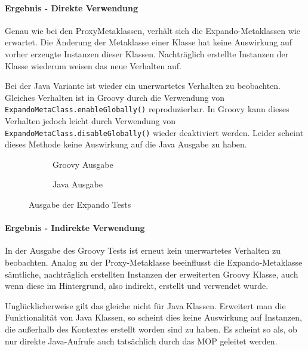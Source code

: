 \paragraph{Ergebnis - Direkte Verwendung}
Genau wie bei den ProxyMetaklassen, verhält sich die Expando-Metaklassen wie erwartet.
Die Änderung der Metaklasse einer Klasse hat keine Auswirkung auf vorher erzeugte Instanzen dieser Klassen.
Nachträglich erstellte Instanzen der Klasse wiederum weisen das neue Verhalten auf.

Bei der Java Variante ist wieder ein unerwartetes Verhalten zu beobachten.
Gleiches Verhalten ist in Groovy durch die Verwendung von \texttt{ExpandoMetaClass.enableGlobally()} reproduzierbar. 
In Groovy kann dieses Verhalten jedoch leicht durch Verwendung von \texttt{ExpandoMetaClass.disableGlobally()} wieder deaktiviert werden.
Leider scheint dieses Methode keine Auswirkung auf die Java Ausgabe zu haben.



\begin{figure}[h!]
	\begin{subfigure}{\textwidth}
		
		\caption{Groovy Ausgabe}
	\end{subfigure}
	
	\begin{subfigure}{\textwidth}
		
		\caption{Java Ausgabe}
	\end{subfigure}
	
	\caption{Ausgabe der Expando Tests}
	\label{fig:expando-out}
\end{figure}

\paragraph{Ergebnis - Indirekte Verwendung}
In der Ausgabe des Groovy Tests ist erneut kein unerwartetes Verhalten zu beobachten.
Analog zu der Proxy-Metaklasse beeinflusst die Expando-Metaklasse sämtliche, nachträglich erstellten Instanzen der erweiterten Groovy Klasse, auch wenn diese im Hintergrund, also indirekt, erstellt und verwendet wurde. 

Unglücklicherweise gilt das gleiche nicht für Java Klassen. 
Erweitert man die Funktionalität von Java Klassen, so scheint dies keine Auswirkung auf Instanzen, die außerhalb des Kontextes erstellt worden sind zu haben.
Es scheint so als, ob nur direkte Java-Aufrufe auch tatsächlich durch das MOP geleitet werden.


